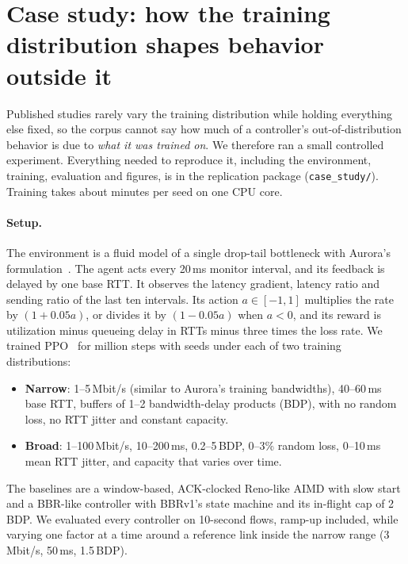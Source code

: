 \section{Case study: how the training distribution shapes behavior outside it}
\label{sec:case-study}

Published studies rarely vary the training distribution while holding everything else fixed, so the corpus cannot say how much of a controller's out-of-distribution behavior is due to \emph{what it was trained on}. We therefore ran a small controlled experiment. Everything needed to reproduce it, including the environment, training, evaluation and figures, is in the replication package (\texttt{case\_study/}). Training takes about \nCsTrainMinutes{} minutes per seed on one CPU core.

\paragraph{Setup.} The environment is a fluid model of a single drop-tail bottleneck with Aurora's formulation~\cite{jay2019aurora}. The agent acts every 20\,ms monitor interval, and its feedback is delayed by one base RTT. It observes the latency gradient, latency ratio and sending ratio of the last ten intervals. Its action $a\in[-1,1]$ multiplies the rate by $(1+0.05a)$, or divides it by $(1-0.05a)$ when $a<0$, and its reward is utilization minus queueing delay in RTTs minus three times the loss rate. We trained PPO~\cite{schulman2017ppo} for \nCsSteps{} million steps with \nCsSeeds{} seeds under each of two training distributions:
\begin{itemize}
  \item \textbf{Narrow}: 1--5\,Mbit/s (similar to Aurora's training bandwidths), 40--60\,ms base RTT, buffers of 1--2 bandwidth-delay products (BDP), with no random loss, no RTT jitter and constant capacity.
  \item \textbf{Broad}: 1--100\,Mbit/s, 10--200\,ms, 0.2--5\,BDP, 0--3\% random loss, 0--10\,ms mean RTT jitter, and capacity that varies over time.
\end{itemize}
The baselines are a window-based, ACK-clocked Reno-like AIMD with slow start and a BBR-like controller with BBRv1's state machine and its in-flight cap of 2\,BDP. We evaluated every controller on 10-second flows, ramp-up included, while varying one factor at a time around a reference link inside the narrow range (3\,Mbit/s, 50\,ms, 1.5\,BDP).

